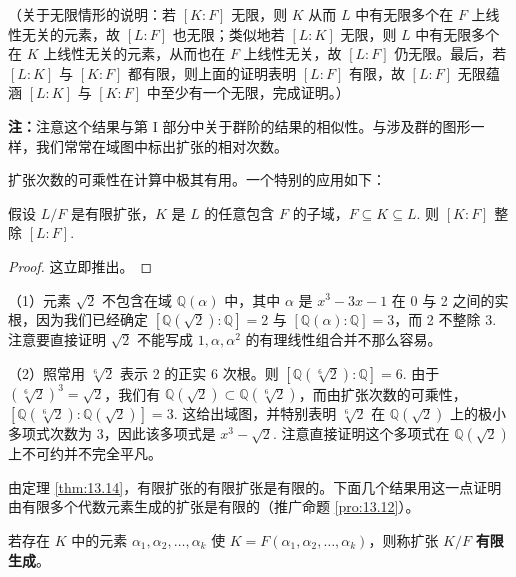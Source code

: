 （关于无限情形的说明：若 \([K:F]\) 无限，则 \(K\) 从而 \(L\) 中有无限多个在 \(F\) 上线性无关的元素，故 \([L:F]\) 也无限；类似地若 \([L:K]\) 无限，则 \(L\) 中有无限多个在 \(K\) 上线性无关的元素，从而也在 \(F\) 上线性无关，故 \([L:F]\) 仍无限。最后，若 \([L:K]\) 与 \([K:F]\) 都有限，则上面的证明表明 \([L:F]\) 有限，故 \([L:F]\) 无限蕴涵 \([L:K]\) 与 \([K:F]\) 中至少有一个无限，完成证明。）

\noindent\textbf{注：}注意这个结果与第 I 部分中关于群阶的结果的相似性。与涉及群的图形一样，我们常常在域图中标出扩张的相对次数。

扩张次数的可乘性在计算中极其有用。一个特别的应用如下：

\begin{corollary}\label{cor:13.15}
假设 \(L/F\) 是有限扩张，\(K\) 是 \(L\) 的任意包含 \(F\) 的子域，\(F \subseteq K \subseteq L\). 则 \([K:F]\) 整除 \([L:F]\).
\end{corollary}

\begin{proof}
这立即推出。
\end{proof}

\begin{example}
（1）元素 \(\sqrt{2}\) 不包含在域 \(\mathbb{Q}(\alpha)\) 中，其中 \(\alpha\) 是 \(x^3-3x-1\) 在 0 与 2 之间的实根，因为我们已经确定 \([\mathbb{Q}(\sqrt{2}):\mathbb{Q}] = 2\) 与 \([\mathbb{Q}(\alpha):\mathbb{Q}] = 3\)，而 2 不整除 3. 注意要直接证明 \(\sqrt{2}\) 不能写成 \(1, \alpha, \alpha^2\) 的有理线性组合并不那么容易。

（2）照常用 \(\sqrt[6]{2}\) 表示 2 的正实 6 次根。则 \([\mathbb{Q}(\sqrt[6]{2}):\mathbb{Q}] = 6\). 由于 \((\sqrt[6]{2})^3 = \sqrt{2}\)，我们有 \(\mathbb{Q}(\sqrt{2}) \subset \mathbb{Q}(\sqrt[6]{2})\)，而由扩张次数的可乘性，\([\mathbb{Q}(\sqrt[6]{2}):\mathbb{Q}(\sqrt{2})] = 3\). 这给出域图，并特别表明 \(\sqrt[6]{2}\) 在 \(\mathbb{Q}(\sqrt{2})\) 上的极小多项式次数为 3，因此该多项式是 \(x^3-\sqrt{2}\). 注意直接证明这个多项式在 \(\mathbb{Q}(\sqrt{2})\) 上不可约并不完全平凡。
\end{example}

由定理 \ref{thm:13.14}，有限扩张的有限扩张是有限的。下面几个结果用这一点证明由有限多个代数元素生成的扩张是有限的（推广命题 \ref{pro:13.12}）。

\begin{definition}
若存在 \(K\) 中的元素 \(\alpha_1, \alpha_2, \ldots, \alpha_k\) 使 \(K = F(\alpha_1, \alpha_2, \ldots, \alpha_k)\)，则称扩张 \(K/F\) \textbf{有限生成}。
\end{definition}

